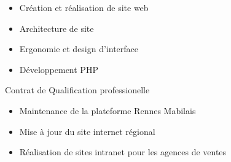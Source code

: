 \documentclass[10pt,a4paper]{altacv}
\begin{document}
\divider

\begin{itemize}
\item Création et réalisation de site web
\item Architecture de site
\item Ergonomie et design d'interface
\item Développement PHP
\end{itemize}

\divider

Contrat de Qualification professionelle
\begin{itemize}
\item Maintenance de la plateforme Rennes Mabilais
\item Mise à jour du site internet régional
\item Réalisation de sites intranet pour les agences de ventes
\end{itemize}
\clearpage
\end{document}
